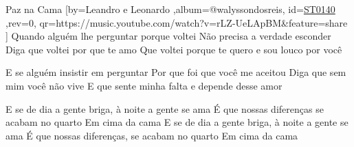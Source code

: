 \beginsong
{Paz na Cama %
}[by={Leandro e Leonardo %
},album={@walyssondosreis},
id={\href{https://music.youtube.com/watch?v=rLZ-UeLApBM&feature=share %
}{ST0140 %
}},rev={0}, %
qr={https://music.youtube.com/watch?v=rLZ-UeLApBM&feature=share %
}]
\beginverse
Quando alguém lhe perguntar porque voltei
Não precisa a verdade esconder
Diga que voltei por que te amo
Que voltei porque te quero e sou louco por você
\endverse

\beginverse
E se alguém insistir em perguntar
Por que foi que você me aceitou
Diga que sem mim você não vive
E que sente minha falta e depende desse amor
\endverse

\beginchorus
E se de dia a gente briga, à noite a gente se ama
É que nossas diferenças se acabam no quarto
Em cima da cama
E se de dia a gente briga, à noite a gente se ama
É que nossas diferenças, se acabam no quarto
Em cima da cama
\endchorus

